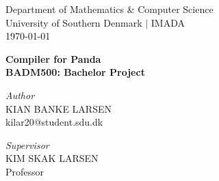 

\usepackage[block=ragged, sorting=nyt, style=authoryear-ibid, backend=biber]{biblatex}
\setlength{}



\begin{titlepage}
\begin{centering}
\vspace*{-20px}\large Department of Mathematics \& Computer Science\\
University of Southern Denmark $|$ IMADA \\
\today \\

\vspace{4CM}

\huge{\bf  Compiler for Panda} \\
\Large{\bf BADM500: Bachelor Project}

\vspace{\fill}

\begin{minipage}{0.45\textwidth} 
\begin{flushleft}
    \Large
    \textit{Author}\\
    KIAN BANKE LARSEN\\
    kilar20@student.sdu.dk
\end{flushleft}
\end{minipage}

\vspace{\fill}

\begin{minipage}{0.45\textwidth}
\begin{flushleft}
    \Large
    \textit{Supervisor}\\
    KIM SKAK LARSEN\\
    Professor
\end{flushleft}
\end{minipage}

\vspace{\fill}

\vspace*{-0.95cm}

\end{centering}

\thispagestyle{empty}
\end{titlepage}

